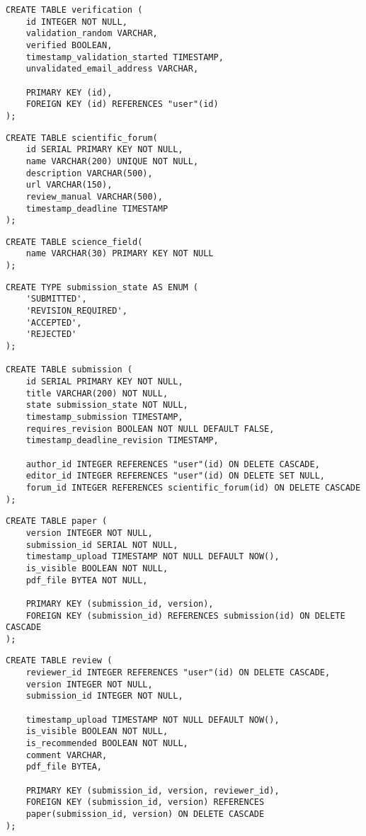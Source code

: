 \begin{lstlisting}[caption={DDL von Verifizierung}]
CREATE TABLE verification (
	id INTEGER NOT NULL,
	validation_random VARCHAR,
	verified BOOLEAN,
	timestamp_validation_started TIMESTAMP,
	unvalidated_email_address VARCHAR,

	PRIMARY KEY (id),
	FOREIGN KEY (id) REFERENCES "user"(id)
);
\end{lstlisting}

\begin{lstlisting}[caption={DDL von wissenschaftlichen Foren}]
CREATE TABLE scientific_forum(
	id SERIAL PRIMARY KEY NOT NULL,
	name VARCHAR(200) UNIQUE NOT NULL,
	description VARCHAR(500),
	url VARCHAR(150),
	review_manual VARCHAR(500),
	timestamp_deadline TIMESTAMP
);
\end{lstlisting}

\begin{lstlisting}[caption={DDL von Fachgebieten}]
CREATE TABLE science_field(
	name VARCHAR(30) PRIMARY KEY NOT NULL
);
\end{lstlisting}
\begin{lstlisting}[caption={DDL von Einreichungen}]
CREATE TYPE submission_state AS ENUM (
	'SUBMITTED',
	'REVISION_REQUIRED',
	'ACCEPTED',
	'REJECTED'
);

CREATE TABLE submission (
	id SERIAL PRIMARY KEY NOT NULL,
	title VARCHAR(200) NOT NULL,
	state submission_state NOT NULL,
	timestamp_submission TIMESTAMP,
	requires_revision BOOLEAN NOT NULL DEFAULT FALSE,
	timestamp_deadline_revision TIMESTAMP,

	author_id INTEGER REFERENCES "user"(id) ON DELETE CASCADE,
	editor_id INTEGER REFERENCES "user"(id) ON DELETE SET NULL,
	forum_id INTEGER REFERENCES scientific_forum(id) ON DELETE CASCADE
);
\end{lstlisting}

\begin{lstlisting}[caption={DDL von Papers}]
CREATE TABLE paper (
	version INTEGER NOT NULL,
	submission_id SERIAL NOT NULL,
	timestamp_upload TIMESTAMP NOT NULL DEFAULT NOW(),
	is_visible BOOLEAN NOT NULL,
	pdf_file BYTEA NOT NULL,

	PRIMARY KEY (submission_id, version),
	FOREIGN KEY (submission_id) REFERENCES submission(id) ON DELETE CASCADE
);
\end{lstlisting}

\begin{lstlisting}[caption={DDL von Gutachten}]
CREATE TABLE review (
	reviewer_id INTEGER REFERENCES "user"(id) ON DELETE CASCADE,
	version INTEGER NOT NULL,
	submission_id INTEGER NOT NULL,

	timestamp_upload TIMESTAMP NOT NULL DEFAULT NOW(),
	is_visible BOOLEAN NOT NULL,
	is_recommended BOOLEAN NOT NULL,
	comment VARCHAR,
	pdf_file BYTEA,

	PRIMARY KEY (submission_id, version, reviewer_id),
	FOREIGN KEY (submission_id, version) REFERENCES
	paper(submission_id, version) ON DELETE CASCADE
);
\end{lstlisting}

